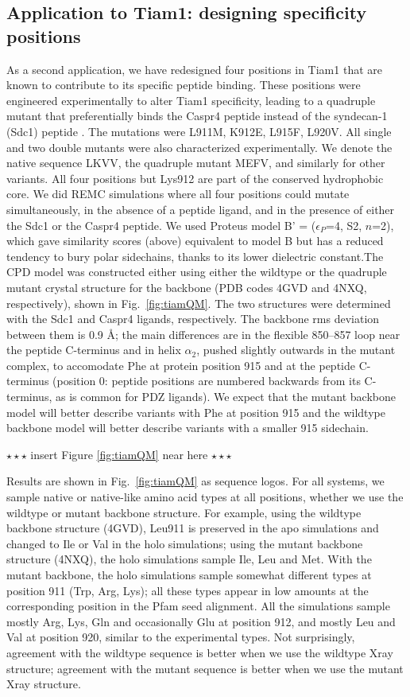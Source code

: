\documentclass[12pt]{article}
\begin{document}
\subsection{Application to Tiam1: designing specificity positions}
As a second application, we have redesigned four positions in Tiam1 that are known to contribute to its specific peptide binding.
These positions were engineered experimentally to alter Tiam1 specificity, leading to a quadruple mutant that preferentially binds
the Caspr4 peptide instead of the syndecan-1 (Sdc1) peptide \cite{Sheperd11}. The mutations were L911M, K912E, L915F, L920V. All
single and two double mutants were also characterized experimentally. We denote the native sequence LKVV, the quadruple mutant MEFV,
and similarly for other variants. All four positions but Lys912 are part of the conserved hydrophobic core. We did REMC simulations
where all four positions could mutate simultaneously, in the absence of a peptide ligand, and in the presence of either the Sdc1
or the Caspr4 peptide. We used Proteus model B' = ($\epsilon_P$=4, S2, $n$=2), which gave similarity scores (above) equivalent
to model B but has a reduced tendency to bury polar sidechains, thanks to its lower dielectric constant.The CPD model was
constructed either using either the wildtype or the quadruple mutant crystal structure for the backbone (PDB codes 4GVD and 4NXQ,
respectively), shown in Fig.\ \ref{fig:tiamQM}. The two structures were determined with the Sdc1 and Caspr4 ligands, respectively.
The backbone rms deviation between them is 0.9 \AA; the main differences are in the flexible 850--857 loop near the peptide C-terminus
and in helix $\alpha_2$, pushed slightly outwards in the mutant complex, to accomodate Phe at protein position 915 and at the
peptide C-terminus (position 0: peptide positions are numbered backwards from its C-terminus, as is common for PDZ ligands).
We expect that the mutant backbone model will better describe variants with Phe at position 915 and the wildtype backbone model
will better describe variants with a smaller 915 sidechain.
\begin{center} $\star \star \star$ insert Figure \ref{fig:tiamQM} near here $\star \star \star$ \end{center}

Results are shown in Fig.\ \ref{fig:tiamQM} as sequence logos. For all systems, we sample native or native-like amino acid types at
all positions, whether we use the wildtype or mutant backbone structure. For example, using the wildtype backbone structure (4GVD),
Leu911 is preserved in the apo simulations and changed to Ile or Val in the holo simulations; using the mutant backbone structure
(4NXQ), the holo simulations sample Ile, Leu and Met. With the mutant backbone, the holo simulations sample somewhat different types
at position 911 (Trp, Arg, Lys); all these types appear in low amounts at the corresponding position in the Pfam seed alignment.
All the simulations sample mostly Arg, Lys, Gln and occasionally Glu at position 912, and mostly Leu and Val at position 920,
similar to the experimental types. Not surprisingly, agreement with the wildtype sequence is better when we use the wildtype Xray
structure; agreement with the mutant sequence is better when we use the mutant Xray structure.
\end{document}
